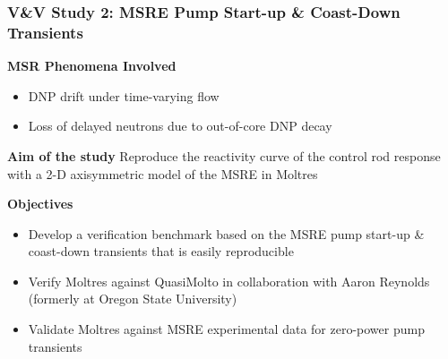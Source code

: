 \begin{frame}
  \frametitle{V\&V Study 2: MSRE Pump Start-up \& Coast-Down Transients}
  \begin{block}{\textbf{MSR Phenomena Involved}}
    \begin{itemize}
      \item DNP drift under time-varying flow
      \item Loss of delayed neutrons due to out-of-core DNP decay
    \end{itemize}
  \end{block}
  \begin{block}{\textbf{Aim of the study}}
    Reproduce the reactivity curve of the control rod response with a 2-D axisymmetric model of the
    MSRE in Moltres
  \end{block}
  \begin{block}{\textbf{Objectives}}
    \begin{itemize}
      \item Develop a verification benchmark based on the MSRE pump start-up \& coast-down
        transients that is easily reproducible
      \item Verify Moltres against QuasiMolto in collaboration with Aaron Reynolds
        (formerly at Oregon State University)
      \item Validate Moltres against MSRE experimental data for zero-power pump transients
    \end{itemize}
  \end{block}
\end{frame}

